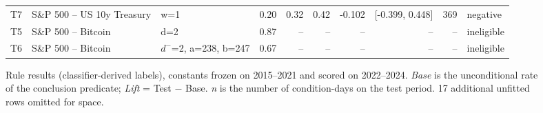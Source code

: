 \begin{figure}[t]
{\begin{tabular}{lllrrrrrrl}
T7 & S\&P 500 -- US 10y Treasury & w=1 & 0.20 & 0.32 & 0.42 & -0.102 & [-0.399, 0.448] & 369 & negative \\
T5 & S\&P 500 -- Bitcoin & d=2 & 0.87 & -- & -- & -- & -- & -- & ineligible \\
T6 & S\&P 500 -- Bitcoin & $d^-$=2, a=238, b=247 & 0.67 & -- & -- & -- & -- & -- & ineligible \\
\bottomrule
\end{tabular}
}
\caption{Rule results (classifier-derived labels), constants frozen on 2015--2021 and scored on 2022--2024. \emph{Base} is the unconditional rate of the conclusion predicate; \emph{Lift} = Test $-$ Base. \emph{n} is the number of condition-days on the test period. 17 additional unfitted rows omitted for space.}
\label{fig:rule-results_classifier-pub}
\end{figure}
